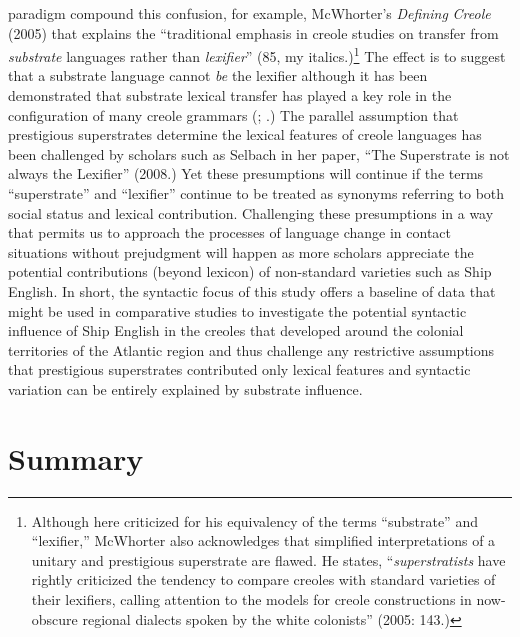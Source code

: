 paradigm compound this confusion, for example, McWhorter’s \textit{Defining} \textit{Creole} (2005) that explains the “traditional emphasis in creole studies on transfer from \textit{substrate} languages rather than \textit{lexifier}” (85, my italics.)\footnote{Although here criticized for his equivalency of the terms “substrate” and “lexifier,” McWhorter also acknowledges that simplified interpretations of a unitary and prestigious superstrate are flawed. He states, “\textit{superstratists} have rightly criticized the tendency to compare creoles with standard varieties of their lexifiers, calling attention to the models for creole constructions in now-obscure regional dialects spoken by the white colonists” (2005: 143.)}  The effect is to suggest that a substrate language cannot \textit{be} the lexifier although it has been demonstrated that substrate lexical transfer has played a key role in the configuration of many creole grammars (\citealt{Kihm1989}; \citealt{Migge1998}.) The parallel assumption that prestigious superstrates determine the lexical features of creole languages has been challenged by scholars such as Selbach in her paper, “The Superstrate is not always the Lexifier” (2008.) Yet these presumptions will continue if the terms “superstrate” and “lexifier” continue to be treated as synonyms referring to both social status and lexical contribution. Challenging these presumptions in a way that permits us to approach the processes of language change in contact situations without prejudgment will happen as more scholars appreciate the potential contributions (beyond lexicon) of non-standard varieties such as Ship English. In short, the syntactic focus of this study offers a baseline of data that might be used in comparative studies to investigate the potential syntactic influence of Ship English in the creoles that developed around the colonial territories of the Atlantic region and thus challenge any restrictive assumptions that prestigious superstrates contributed only lexical features and syntactic variation can be entirely explained by substrate influence. 

\section{\textbf{Summary}}%

